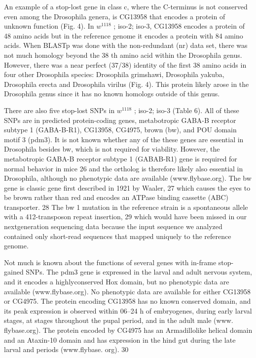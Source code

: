 An example of a stop-lost gene in class c, where the C-terminus is not conserved even among the Drosophila genera, is CG13958 that encodes a protein of unknown function (Fig. 4). In $w^{1118}$ ; iso-2; iso-3, CG13958 encodes a protein of 48 amino acids but in the reference genome it encodes a protein with 84 amino acids.  When BLASTp was done with the non-redundant (nr) data set, there was not much homology beyond the 38 th amino acid within the Drosophila genus. However, there was a near perfect (37/38) identity of the first 38 amino acids in four other Drosophila species: Drosophila grimshawi, Drosophila yakuba, Drosophila erecta and Drosophila virilus (Fig. 4). This protein likely arose in the Drosophila genus since it has no known homologs outside of this genus.

There are also five stop-lost SNPs in $w^{1118}$ ; iso-2; iso-3 (Table 6). All of these SNPs are in predicted protein-coding genes, metabotropic GABA-B receptor subtype 1 (GABA-B-R1), CG13958, CG4975, brown (bw), and POU domain motif 3 (pdm3). It is not known whether any of the these genes are essential in Drosophila besides bw, which is not required for viability.  However, the metabotropic GABA-B receptor subtype 1 (GABAB-R1) gene is required for normal behavior in mice 26 and the ortholog is therefore likely also essential in Drosophila, although no phenotypic data are available (www.flybase.org). The bw gene is classic gene first described in 1921 by Waaler, 27 which causes the eyes to be brown rather than red and encodes an ATPase binding cassette (ABC) transporter. 28 The bw 1 mutation in the reference strain is a spontaneous allele with a 412-transposon repeat insertion, 29 which would have been missed in our nextgeneration sequencing data because the input sequence we analyzed contained only short-read sequences that mapped uniquely to the reference genome.

Not much is known about the functions of several genes with in-frame stop-gained SNPs. The pdm3 gene is expressed in the larval and adult nervous system, and it encodes a highlyconserved Hox domain, but no phenotypic data are available (www.flybase.org). No phenotypic data are available for either CG13958 or CG4975. The protein encoding CG13958 has no known conserved domain, and its peak expression is observed within 06–24 h of embryogenes, during early larval stages, at stages throughout the pupal period, and in the adult male (www.  flybase.org). The protein encoded by CG4975 has an Armadillolike helical domain and an Ataxin-10 domain and has expression in the hind gut during the late larval and periods (www.flybase.  org). 30

